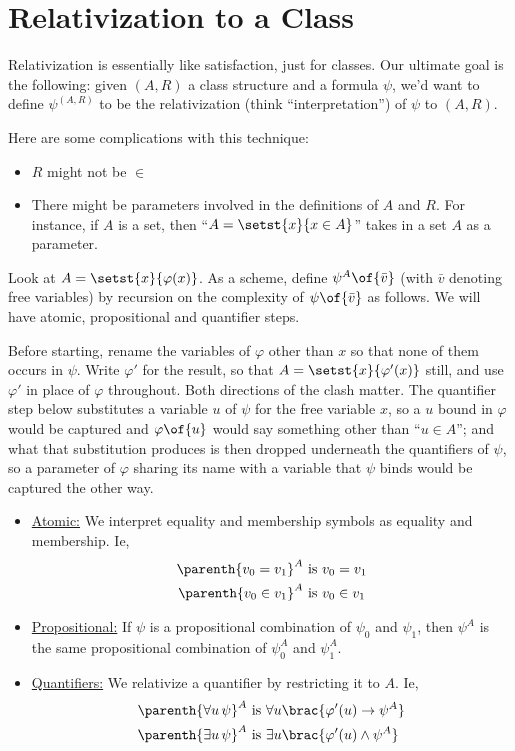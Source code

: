 \section{Relativization to a Class}

Relativization is essentially like satisfaction, just for classes. Our ultimate goal is the following: given $(A, R)$ a class structure and a formula $\psi$, we'd want to define $\psi^{(A, R)}$ to be the relativization (think ``interpretation'') of $\psi$ to $(A, R)$.

Here are some complications with this technique:
\begin{itemize}
    \item $R$ might not be $\in$
    \item There might be parameters involved in the definitions of $A$ and $R$. For instance, if $A$ is a set, then ``$A = \setst{x}{x \in A}$'' takes in a set $A$ as a parameter.
\end{itemize}

Look at $A = \setst{x}{\varphi(x)}$. As a scheme, define $\psi^A\of{\bar{v}}$ (with $\bar{v}$ denoting free variables) by recursion on the complexity of $\psi\of{\bar{v}}$ as follows. We will have atomic, propositional and quantifier steps.

Before starting, rename the variables of $\varphi$ other than $x$ so that none of them occurs in $\psi$. Write $\varphi'$ for the result, so that $A = \setst{x}{\varphi'(x)}$ still, and use $\varphi'$ in place of $\varphi$ throughout. Both directions of the clash matter. The quantifier step below substitutes a variable $u$ of $\psi$ for the free variable $x$, so a $u$ bound in $\varphi$ would be captured and $\varphi\of{u}$ would say something other than ``$u \in A$''; and what that substitution produces is then dropped underneath the quantifiers of $\psi$, so a parameter of $\varphi$ sharing its name with a variable that $\psi$ binds would be captured the other way.
\begin{itemize}
    \item \underline{Atomic:} We interpret equality and membership symbols as equality and membership. Ie,
    \begin{align*}
        \parenth{v_0 = v_1}^A &\text{ is } v_0 = v_1 \\
        \parenth{v_0 \in v_1}^A &\text{ is } v_0 \in v_1 
    \end{align*}

    \item \underline{Propositional:} If $\psi$ is a propositional combination of $\psi_0$ and $\psi_1$, then $\psi^A$ is the same propositional combination of $\psi_0^A$ and $\psi_1^A$.

    \item \underline{Quantifiers:} We relativize a quantifier by restricting it to $A$. Ie,
    \begin{align*}
        \parenth{\forall u \, \psi}^A &\text{ is } \forall u \brac{\varphi'(u) \to \psi^A} \\
        \parenth{\exists u \, \psi}^A &\text{ is } \exists u \brac{\varphi'(u) \land \psi^A}
    \end{align*}
\end{itemize}

